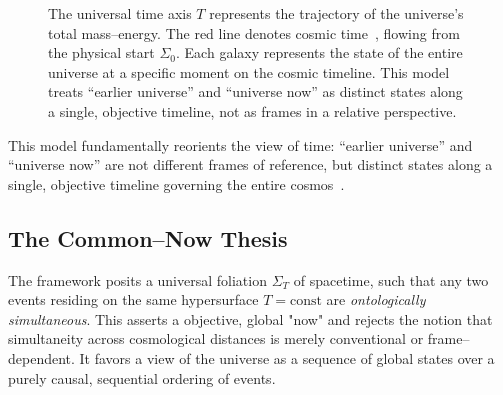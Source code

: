 \documentclass[12pt]{article}
\theoremstyle{plain}
\begin{document}
\begin{figure}[h]
    \caption{The universal time axis $T$ represents the trajectory of the universe's total mass–energy. The red line denotes cosmic time~\cite{Minkowski1908}, flowing from the physical start $\Sigma_0$. Each galaxy represents the state of the entire universe at a specific moment on the cosmic timeline. This model treats ``earlier universe'' and ``universe now'' as distinct states along a single, objective timeline, not as frames in a relative perspective.}
    \label{fig:t–axis}
\end{figure}

\noindent This model fundamentally reorients the view of time: “earlier universe” and “universe now” are not different frames of reference, but distinct states along a single, objective timeline governing the entire cosmos~\cite{Mermin1984}.

\subsection{The Common–Now Thesis}
\label{sec:simultaneity}
The framework posits a universal foliation ${\Sigma_T}$ of spacetime, such that any two events residing on the same hypersurface $T = \text{const}$ are \emph{ontologically simultaneous}. This asserts a objective, global "now" and rejects the notion that simultaneity across cosmological distances is merely conventional or frame–dependent. It favors a view of the universe as a sequence of global states over a purely causal, sequential ordering of events.
\end{document}
